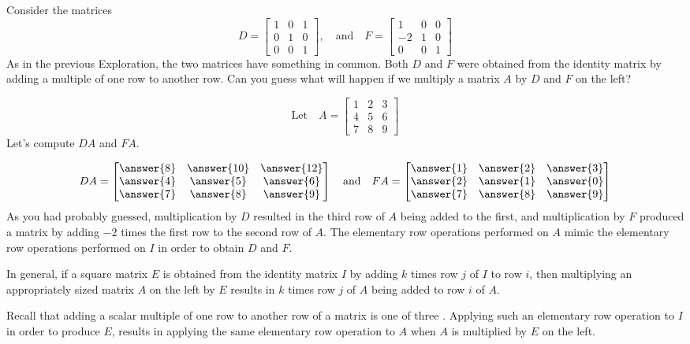 \documentclass{ximera}
\begin{document}
\begin{exploration}\label{init:elementarymat1}
Consider the matrices
$$
D = \begin{bmatrix}  
 1&0&1\\0&1&0\\0&0&1
 \end{bmatrix},
 \quad \text{and}\quad
F =  \begin{bmatrix}  
 1&0&0\\-2&1&0\\0&0&1
 \end{bmatrix}
$$
As in the previous Exploration, the two matrices have something in common.  Both $D$ and $F$ were obtained from the identity matrix by adding a multiple of one row to another row.  Can you guess what will happen if we multiply a matrix $A$ by $D$ and $F$ on the left?

$$\text{Let}\quad A = \begin{bmatrix}  
 1&2&3\\4&5&6\\7&8&9
 \end{bmatrix}$$
Let's compute $DA$ and $FA$.

$$DA=\begin{bmatrix}\answer{8} & \answer{10} & \answer{12} \\ \answer{4} & \answer{5} & \answer{6}\\ \answer{7} & \answer{8} & \answer{9}\end{bmatrix}
\quad
\text{and}
\quad
FA=\begin{bmatrix}\answer{1} & \answer{2} & \answer{3} \\ \answer{2} & \answer{1} & \answer{0}\\ \answer{7} & \answer{8} & \answer{9}\end{bmatrix}$$
As you had probably guessed, multiplication by $D$ resulted in the third row of $A$ being added to the first, and multiplication by $F$ produced a matrix by adding $-2$ times the first row to the second row of $A$.  The elementary row operations performed on $A$ mimic the elementary row operations performed on $I$ in order to obtain $D$ and $F$.
 \end{exploration}

In general, if a square matrix $E$ is obtained from the identity matrix $I$ by adding $k$ times row $j$ of $I$ to row $i$,  then multiplying an appropriately sized matrix $A$ on the left by $E$ results in $k$ times row $j$ of $A$ being added to row $i$ of $A$.  
 
 Recall that adding a scalar multiple of one row to another row of a matrix is one of three .  Applying such an elementary row operation to $I$ in order to produce $E$, results in applying the same elementary row operation to $A$ when $A$ is multiplied by $E$ on the left.
\end{document}
